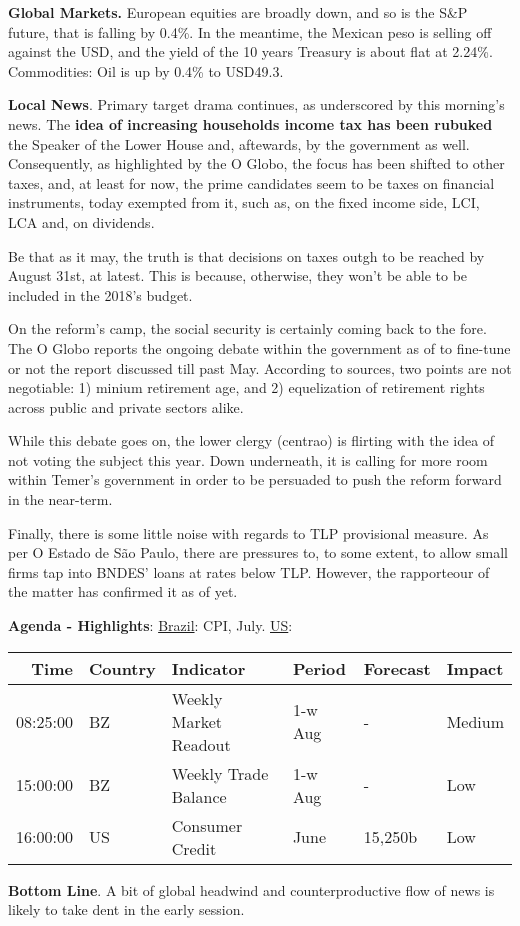 \documentclass[11pt]{article}
\date{\today}
\title{}
\begin{document}
\textbf{Global Markets.} European equities are broadly down, and so is the
S\&P future, that is falling by 0.4\%. In the meantime, the Mexican peso is
selling off  against the USD, and the yield of the 10 years
Treasury is about flat at 2.24\%. Commodities: Oil is up by 0.4\% to
USD49.3.

\textbf{Local News}. Primary target drama continues, as underscored by this
morning's news. The \textbf{idea of increasing households income tax has been
rubuked} the Speaker of the Lower House and, aftewards, by the
government as well. Consequently, as highlighted by the O Globo, the
focus has been shifted to other taxes, and, at least for now,
the prime candidates seem to be taxes on financial instruments, today
exempted from it, such as, on the fixed income side, LCI, LCA and, on dividends.

Be that as it may, the truth is that decisions on taxes outgh to be
reached by August 31st, at latest. This is because, otherwise, they
won't be able to be included in the 2018's budget.

On the reform's camp, the social security is certainly coming back to
the fore. The O Globo reports the ongoing debate within the government
as of to fine-tune or not the report discussed till past
May. According to sources, two points are not negotiable: 1) minium
retirement age, and 2) equelization of retirement rights across public
and private sectors alike.

While this debate goes on, the lower clergy (centrao) is flirting with
the idea of not voting the subject this year. Down underneath, it is
calling for more room within Temer's government in order to be
persuaded to push the reform forward in the near-term.

Finally, there is some little noise with regards to TLP provisional
measure. As per O Estado de São Paulo, there are pressures to, to some
extent, to allow small firms tap into BNDES' loans at rates below
TLP. However, the rapporteour of the matter has confirmed it as of
yet.


\textbf{Agenda - Highlights}: \uline{Brazil}: CPI, July. \uline{US}:


\vspace{-0.5cm}
\begin{center}
\begin{tabular}{rlllll}
\textbf{Time} & \textbf{Country} & \textbf{Indicator} & \textbf{Period} & \textbf{Forecast} & \textbf{Impact}\\
\hline
08:25:00 & BZ & Weekly Market Readout & 1-w Aug & - & Medium\\
15:00:00 & BZ & Weekly Trade Balance & 1-w Aug & - & Low\\
16:00:00 & US & Consumer Credit & June & 15,250b & Low\\
\end{tabular}
\end{center}

\textbf{Bottom Line}. A bit of global headwind and counterproductive flow of
news is likely to take dent in the early session.
\end{document}
